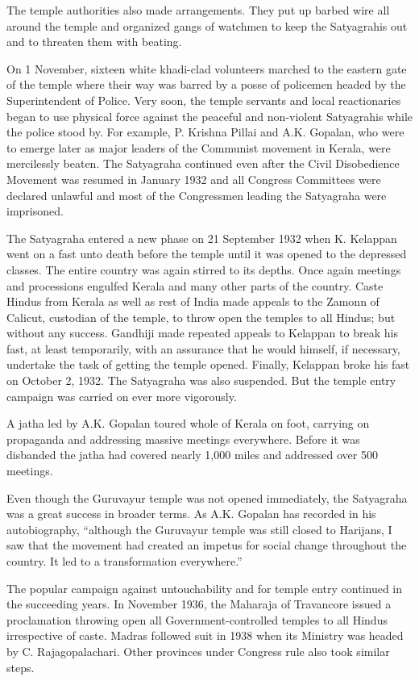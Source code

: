 \begin{multicols}{2}
The temple authorities also made arrangements. They put up barbed wire all around the temple and organized gangs of watchmen to keep the Satyagrahis out and to threaten them with beating.

On 1 November, sixteen white khadi-clad volunteers marched to the eastern gate of the temple where their way was barred by a posse of policemen headed by the Superintendent of Police. Very soon, the temple servants and local reactionaries began to use physical force against the peaceful and non-violent Satyagrahis while the police stood by. For example, P. Krishna Pillai and A.K. Gopalan, who were to emerge later as major leaders of the Communist movement in Kerala, were mercilessly beaten. The Satyagraha continued even after the Civil Disobedience Movement was resumed in January 1932 and all Congress Committees were declared unlawful and most of the Congressmen leading the Satyagraha were imprisoned.

The Satyagraha entered a new phase on 21 September 1932 when K. Kelappan went on a fast unto death before the temple until it was opened to the depressed classes. The entire country was again stirred to its depths. Once again meetings and processions engulfed Kerala and many other parts of the country. Caste Hindus from Kerala as well as rest of India made appeals to the Zamonn of Calicut, custodian of the temple, to throw open the temples to all Hindus; but without any success. Gandhiji made repeated appeals to Kelappan to break his fast, at least temporarily, with an assurance that he would himself, if necessary, undertake the task of getting the temple opened. Finally, Kelappan broke his fast on October 2, 1932. The Satyagraha was also suspended. But the temple entry campaign was carried on ever more vigorously.

A jatha led by A.K. Gopalan toured whole of Kerala on foot, carrying on propaganda and addressing massive meetings everywhere. Before it was disbanded the jatha had covered nearly 1,000 miles and addressed over 500 meetings.

Even though the Guruvayur temple was not opened immediately, the Satyagraha was a great success in broader terms. As A.K. Gopalan has recorded in his autobiography, ``although the Guruvayur temple was still closed to Harijans, I saw that the movement had created an impetus for social change throughout the country. It led to a transformation everywhere.''

The popular campaign against untouchability and for temple entry continued in the succeeding years. In November 1936, the Maharaja of Travancore issued a proclamation throwing open all Government-controlled temples to all Hindus irrespective of caste. Madras followed suit in 1938 when its Ministry was headed by C. Rajagopalachari. Other provinces under Congress rule also took similar steps.


\end{multicols}
